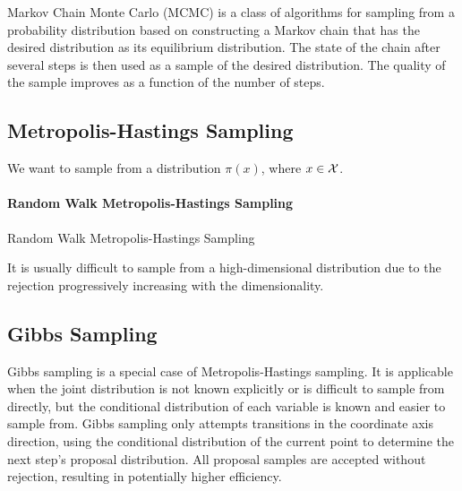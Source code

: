 Markov Chain Monte Carlo (MCMC) is a class of algorithms for sampling from a probability distribution based on constructing a Markov chain that has the desired distribution as its equilibrium distribution. The state of the chain after several steps is then used as a sample of the desired distribution. The quality of the sample improves as a function of the number of steps.

\subsection{Metropolis-Hastings Sampling}

We want to sample from a distribution $\pi(x)$, where $x\in {\mathcal X}$.

\paragraph*{Random Walk Metropolis-Hastings Sampling}

\begin{algorithm}
	\caption{Random Walk Metropolis-Hastings Sampling}
\end{algorithm}

\begin{remark}
	It is usually difficult to sample from a high-dimensional distribution due to the rejection progressively increasing with the dimensionality.
\end{remark}

\subsection{Gibbs Sampling}

Gibbs sampling is a special case of Metropolis-Hastings sampling. It is applicable when the joint distribution is not known explicitly or is difficult to sample from directly, but the conditional distribution of each variable is known and easier to sample from. Gibbs sampling only attempts transitions in the coordinate axis direction, using the conditional distribution of the current point to determine the next step's proposal distribution. All proposal samples are accepted without rejection, resulting in potentially higher efficiency.

